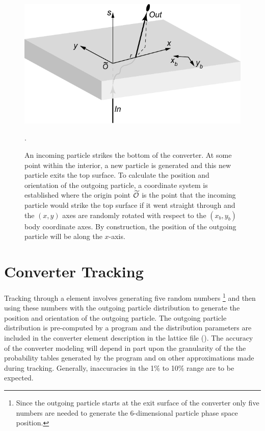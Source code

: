 
\begin{figure}[tb]
  \centering
  \includegraphics[width=5in]{converter.pdf}
  \caption[Converter geometry.]
  {
An incoming particle strikes the bottom of the converter. At some point within the interior, a new
particle is generated and this new particle exits the top surface. To calculate the position and
orientation of the outgoing particle, a coordinate system is established where the origin point
$\widetilde{{\cal O}}$ is the point that the incoming particle would strike the top surface if it went straight
through and the $(x,y)$ axes are randomly rotated with respect to the $(x_b,y_b)$ body coordinate axes.
By construction, the position of the outgoing particle will be along the $x$-axis.
  }
  \label{f:converter}.
\end{figure}

\section{Converter Tracking}
\label{s:converter.track}

Tracking through a  element involves generating five random numbers
  \footnote{
Since the outgoing particle starts at the exit surface of the converter only five numbers
are needed to generate the 6-dimensional particle phase space position.
  }
and then using these numbers with the outgoing particle distribution to generate the position and
orientation of the outgoing particle. The outgoing particle distribution is pre-computed by a
program  and the distribution parameters are included in the
converter element description in the \bmad lattice file (). The accuracy of the
converter modeling will depend in part upon the granularity of the the probability tables generated
by the  program and on other approximations made during
tracking. Generally, inaccuracies in the 1\% to 10\% range are to be expected.

